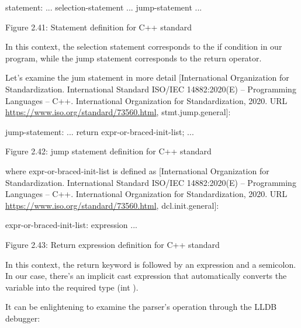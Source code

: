\begin{shell}
statement:
    ...
    selection-statement
    ...
    jump-statement
    ...
\end{shell}

\begin{center}
Figure 2.41: Statement definition for C++ standard
\end{center}

In this context, the selection statement corresponds to the if condition in our program, while the jump statement corresponds to the return operator.

Let's examine the jum statement in more detail [International Organization for Standardization. International Standard ISO/IEC 14882:2020(E) – Programming Languages – C++. International Organization for Standardization, 2020. URL \url{https://www.iso.org/standard/73560.html}, stmt.jump.general]:

\begin{shell}
jump-statement:
    ...
    return expr-or-braced-init-list;
    ...
\end{shell}

\begin{center}
Figure 2.42: jump statement definition for C++ standard
\end{center}

where expr-or-braced-init-list is defined as [International Organization for Standardization. International Standard ISO/IEC 14882:2020(E) – Programming Languages – C++. International Organization for Standardization, 2020. URL \url{https://www.iso.org/standard/73560.html}, dcl.init.general]:

\begin{shell}
expr-or-braced-init-list:
    expression
    ...
\end{shell}

\begin{center}
Figure 2.43: Return expression definition for C++ standard
\end{center}

In this context, the return keyword is followed by an expression and a semicolon. In our case, there's an implicit cast expression that automatically converts the variable into the required type (int ).

It can be enlightening to examine the parser's operation through the LLDB debugger:


